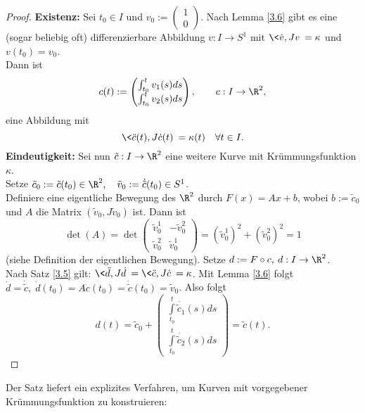 \documentclass{mycourse}
\begin{document}
\begin{st}
\begin{proof}
\textbf{Existenz:}
Sei $t_0 \in I$ und $v_0 := \begin{pmatrix} 1 \\ 0 \end{pmatrix}$. Nach Lemma \ref{3.6} gibt es eine (sogar beliebig oft) differenzierbare Abbildung $v : I \to S^1$ mit $\< \dot v, Jv \> = \kappa$ und $v(t_0) = v_0$. \\
Dann ist
\[ c(t) := \begin{pmatrix}  \int_{t_0}^t v_1(s) ds \\ \int_{t_0}^t v_2(s) ds \end{pmatrix} , \qquad c:I \to \R^2, \]
eine Abbildung mit 
\[ \< \ddot c(t), J \dot c(t) \> = \kappa(t) \quad \forall t \in I. \]
\textbf{Eindeutigkeit:}
Sei nun $\tilde c: I \to \R^2$ eine weitere Kurve mit Krümmungsfunktion $\kappa$.\\ Setze $\tilde c_0 := \tilde c(t_0) \in \R^2, \quad \tilde v_0 := \dot{\tilde c}(t_0) \in S^1$. \\
Definiere eine eigentliche Bewegung des $\R^2$ durch $F(x) = Ax + b$, wobei $b := \tilde c_0$ und $A$ die Matrix $(\tilde v_0, J \tilde v_0)$ ist. Dann ist
\[ \det(A) = \det \begin{pmatrix} \tilde v_0^1 & - \tilde v_0^2 \\ \tilde v_0^2 & \tilde v_0^1 \end{pmatrix} = (\tilde v_0^1)^2 + (\tilde v_0^2)^2 = 1 \]
(siehe Definition der eigentlichen Bewegung). Setze $d := F \circ c, \: d: I \to \R^2$. \\
Nach Satz \ref{3.5} gilt: $ \< \ddot d, J \dot d \> = \< \ddot c, J \dot c \> = \kappa$. Mit Lemma \ref{3.6} folgt $ \dot d = \dot{\tilde c}, \; \dot d(t_0) = A \dot c(t_0) = \dot{\tilde c}(t_0) = \tilde v_0$.
Also folgt
\[ d(t) = \tilde c_0 + \begin{pmatrix}  \int\limits_{t_0}^t \dot{\tilde c_1}(s) ds \\ \int\limits_{t_0}^t \dot{\tilde c_2}(s) ds \end{pmatrix} = \tilde c(t). \]
\end{proof}
\end{st}

Der Satz liefert ein explizites Verfahren, um Kurven mit vorgegebener Krümmungsfunktion zu konstruieren:
\end{document}
